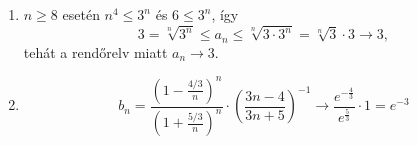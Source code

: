 \documentclass[11pt]{scrartcl}
\begin{document}
\begin{enumerate}
	\item $n \ge 8$ esetén $n^4 \le 3^n$ és $6 \le 3^n$, így
	      \[
		      3
		      = \sqrt[n]{3^n}
		      \le a_n
		      \le \sqrt[n]{3 \cdot 3^n}
		      = \sqrt[n]{3} \cdot 3
		      \to 3,
	      \]
	      tehát a rendőrelv miatt $a_n \to 3$.

	\item \[
		      b_n
		      = \frac{\left(1 - \frac{4/3}{n}\right)^n}{\left(1 + \frac{5/3}{n}\right)^n}
		      \cdot \left( \frac{3n - 4}{3n + 5} \right)^{-1}
		      \to \frac{e^{-\frac{4}{3}}}{e^{\frac{5}{3}}} \cdot 1
		      = e^{-3}
	      \]
\end{enumerate}
\end{document}
